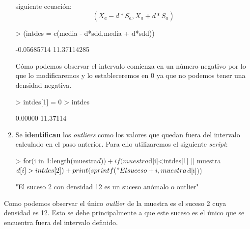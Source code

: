 \documentclass [a4paper] {article}
\begin{document}
\begin{enumerate}
	      siguiente ecuación:
		  \begin{equation*}
			(\overline{X_a} - d*S_{a},\overline{X_a} + d*S_{a})
		  \end{equation*}
\begin{Schunk}
\begin{Sinput}
> (intdes = c(media - d*sdd,media + d*sdd))
\end{Sinput}
\begin{Soutput}
[1] -0.05685714 11.37114285
\end{Soutput}
\end{Schunk}
	Cómo podemos observar el intervalo comienza en un número negativo por lo que lo modificaremos y lo
	estableceremos en 0 ya que no podemos tener una densidad negativa.
\begin{Schunk}
\begin{Sinput}
> intdes[1] = 0
> intdes
\end{Sinput}
\begin{Soutput}
[1]  0.00000 11.37114
\end{Soutput}
\end{Schunk}
	\item Se \textbf{identifican} los \textit{outliers} como los valores que quedan fuera del intervalo
	      calculado en el paso anterior. Para ello utilizaremos el siguiente \textit{script}:
\begin{Schunk}
\begin{Sinput}
> for(i in 1:length(muestra$d))
+ 	if(muestra$d[i]<intdes[1] || muestra$d[i]>intdes[2])
+ 		print(sprintf("El suceso %d con densidad %d es un suceso anómalo o outlier",
+ 		      i,muestra$d[i]))
\end{Sinput}
\begin{Soutput}
[1] "El suceso 2 con densidad 12 es un suceso anómalo o outlier"
\end{Soutput}
\end{Schunk}
\end{enumerate}
Como podemos observar el único \textit{outlier} de la muestra es el suceso 2 cuya densidad es 12.
Esto se debe principalmente a que este suceso es el único que se encuentra fuera del intervalo definido.
\end{document}
